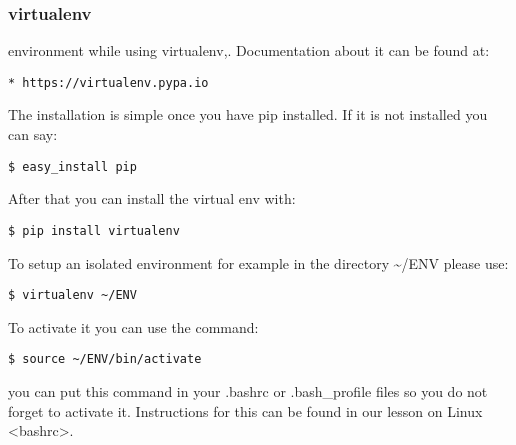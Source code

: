 \subsubsection{virtualenv}\label{virtualenv}

environment while using virtualenv,. Documentation about it can be found
at:

\begin{verbatim}
* https://virtualenv.pypa.io
\end{verbatim}

The installation is simple once you have pip installed. If it is not
installed you can say:

\begin{verbatim}
$ easy_install pip
\end{verbatim}

After that you can install the virtual env with:

\begin{verbatim}
$ pip install virtualenv
\end{verbatim}

To setup an isolated environment for example in the directory
\textasciitilde{}/ENV please use:

\begin{verbatim}
$ virtualenv ~/ENV
\end{verbatim}

To activate it you can use the command:

\begin{verbatim}
$ source ~/ENV/bin/activate
\end{verbatim}

you can put this command in your .bashrc or .bash\_profile files so you
do not forget to activate it. Instructions for this can be
found in our lesson on Linux \textless{}bashrc\textgreater{}.
